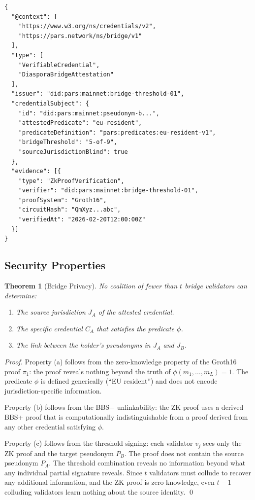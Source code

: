 \documentclass[11pt,a4paper]{article}
\newtheorem{theorem}{Theorem}[section]
\begin{document}
\begin{lstlisting}[language={},caption={Bridge credential example}]
{
  "@context": [
    "https://www.w3.org/ns/credentials/v2",
    "https://pars.network/ns/bridge/v1"
  ],
  "type": [
    "VerifiableCredential",
    "DiasporaBridgeAttestation"
  ],
  "issuer": "did:pars:mainnet:bridge-threshold-01",
  "credentialSubject": {
    "id": "did:pars:mainnet:pseudonym-b...",
    "attestedPredicate": "eu-resident",
    "predicateDefinition": "pars:predicates:eu-resident-v1",
    "bridgeThreshold": "5-of-9",
    "sourceJurisdictionBlind": true
  },
  "evidence": [{
    "type": "ZkProofVerification",
    "verifier": "did:pars:mainnet:bridge-threshold-01",
    "proofSystem": "Groth16",
    "circuitHash": "QmXyz...abc",
    "verifiedAt": "2026-02-20T12:00:00Z"
  }]
}
\end{lstlisting}

\subsection{Security Properties}

\begin{theorem}[Bridge Privacy]
\label{thm:bridge-privacy}
No coalition of fewer than $t$ bridge validators can determine:
\begin{enumerate}[label=(\alph*)]
    \item The source jurisdiction $J_A$ of the attested credential.
    \item The specific credential $C_A$ that satisfies the predicate $\phi$.
    \item The link between the holder's pseudonyms in $J_A$ and $J_B$.
\end{enumerate}
\end{theorem}

\begin{proof}
Property (a) follows from the zero-knowledge property of the Groth16 proof $\pi_1$:
the proof reveals nothing beyond the truth of $\phi(m_1, \ldots, m_L) = 1$. The
predicate $\phi$ is defined generically (``EU resident'') and does not encode
jurisdiction-specific information.

Property (b) follows from the BBS+ unlinkability: the ZK proof uses a derived
BBS+ proof that is computationally indistinguishable from a proof derived from any
other credential satisfying $\phi$.

Property (c) follows from the threshold signing: each validator $v_j$ sees only
the ZK proof and the target pseudonym $P_B$. The proof does not contain the source
pseudonym $P_A$. The threshold combination reveals no information beyond what any
individual partial signature reveals. Since $t$ validators must collude to recover
any additional information, and the ZK proof is zero-knowledge, even $t-1$
colluding validators learn nothing about the source identity. \qed
\end{proof}
\end{document}

